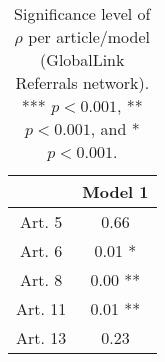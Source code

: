 \begin{table}[ht]
\centering
\begin{tabular}{cc}
  \toprule
 & Model 1 \\ 
  \midrule
Art. 5 & 0.66   \\ 
   \midrule
Art. 6 & 0.01 * \\ 
   \midrule
Art. 8 & 0.00 ** \\ 
   \midrule
Art. 11 & 0.01 ** \\ 
   \midrule
Art. 13 & 0.23   \\ 
   \bottomrule
\end{tabular}
\caption{Significance level of $\rho$ per article/model (GlobalLink Referrals network). *** $p < 0.001$, ** $p < 0.001$, and * $p < 0.001$.} 
\end{table}
